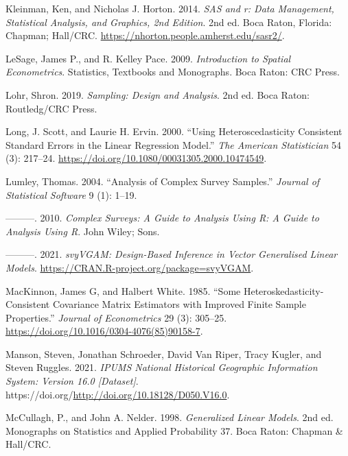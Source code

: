 \documentclass[
  letterpaper,
  DIV=11,
  numbers=noendperiod]{scrreprt}
\newlength{\cslhangindent}
\newlength{\cslentryspacingunit} %
\newenvironment{CSLReferences}[2] %
 {%
  \setlength{\parindent}{0pt}
  \ifodd #1
  \let\oldpar\par
  \def\par{\hangindent=\cslhangindent\oldpar}
  \fi
  \setlength{\parskip}{#2\cslentryspacingunit}
 }%
 {}
\begin{document}
\begin{CSLReferences}{1}{0}
\leavevmode{}%
Kleinman, Ken, and Nicholas J. Horton. 2014. \emph{SAS and r: Data
Management, Statistical Analysis, and Graphics, 2nd Edition}. 2nd ed.
Boca Raton, Florida: Chapman; Hall/CRC.
\url{https://nhorton.people.amherst.edu/sasr2/}.

\leavevmode{}%
LeSage, James P., and R. Kelley Pace. 2009. \emph{Introduction to
Spatial Econometrics}. Statistics, Textbooks and Monographs. Boca Raton:
CRC Press.

\leavevmode{}%
Lohr, Shron. 2019. \emph{Sampling: Design and Analysis}. 2nd ed. Boca
Raton: Routledg/CRC Press.

\leavevmode{}%
Long, J. Scott, and Laurie H. Ervin. 2000. {``Using {Heteroscedasticity}
{Consistent} {Standard} {Errors} in the {Linear} {Regression}
{Model}.''} \emph{The American Statistician} 54 (3): 217--24.
\url{https://doi.org/10.1080/00031305.2000.10474549}.

\leavevmode{}%
Lumley, Thomas. 2004. {``Analysis of Complex Survey Samples.''}
\emph{Journal of Statistical Software} 9 (1): 1--19.

\leavevmode{}%
---------. 2010. \emph{Complex {Surveys}: {A} {Guide} to {Analysis}
{Using} {R}: {A} {Guide} to {Analysis} {Using} {R}}. John Wiley; Sons.

\leavevmode{}%
---------. 2021. \emph{svyVGAM: Design-Based Inference in Vector
Generalised Linear Models}.
\url{https://CRAN.R-project.org/package=svyVGAM}.

\leavevmode{}%
MacKinnon, James G, and Halbert White. 1985. {``Some
Heteroskedasticity-Consistent Covariance Matrix Estimators with Improved
Finite Sample Properties.''} \emph{Journal of Econometrics} 29 (3):
305--25. \url{https://doi.org/10.1016/0304-4076(85)90158-7}.

\leavevmode{}%
Manson, Steven, Jonathan Schroeder, David Van Riper, Tracy Kugler, and
Steven Ruggles. 2021. \emph{IPUMS National Historical Geographic
Information System: Version 16.0 {[}Dataset{]}}.
https://doi.org/\url{http://doi.org/10.18128/D050.V16.0}.

\leavevmode{}%
McCullagh, P., and John A. Nelder. 1998. \emph{Generalized Linear
Models}. 2nd ed. Monographs on Statistics and Applied Probability 37.
Boca Raton: Chapman \& Hall/CRC.


\end{CSLReferences}
\end{document}
